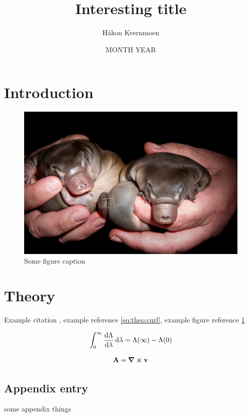\documentclass{article}
\title{Interesting title}
\author{Håkon Kvernmoen}
\date{MONTH YEAR}
\begin{document}
\maketitle

\section{Introduction}

\begin{figure}[H]
    \centering
    \includegraphics[width=0.5\linewidth]{Young-Platypus.jpg}
    \caption{Some figure caption}
    \label{fig:intro:plat}
\end{figure}

\section{Theory}
Example citation \cite{DFTgap}, example reference \eqref{eq:theo:curl}, example figure reference \ref{fig:intro:plat}

\begin{align}
	\int_{0}^{\infty} \dv{\Lambda}{\lambda} \dd{\lambda} = \Lambda(\infty) - \Lambda(0) \label{eq:theo:lambda}
\end{align}

\begin{align}
	\vb{A} = \curl{\vb{v}} \label{eq:theo:curl}  
\end{align}

\begin{appendix}
    \section{Appendix entry}
    some appendix things
\end{appendix}

\printbibliography
\end{document}
